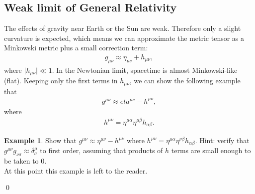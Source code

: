 \documentclass{book}
\theoremstyle{definition}
\newtheorem{exmp}{Example}[section]
\begin{document}
\subsection{Weak limit of General Relativity}
The effects of gravity near Earth or the Sun are weak. Therefore only a slight curvature is expected, which means we can approximate the metric tensor as a Minkowski metric plus a small correction term:
\begin{align*}
g_{\mu\nu} \approx \eta_{\mu\nu} + h_{\mu\nu},
\end{align*}
where $\vert h_{\mu\nu} \vert \ll 1$. In the Newtonian limit, spacetime is almost Minkowski-like (flat). Keeping only the first terms in $h_{\mu\nu}$, we can show the following example that 
\begin{align*}
g^{\mu\nu} \approx eta^{\mu\nu} - h^{\mu\nu},
\end{align*}
where 
\begin{align*}
h^{\mu\nu} = \eta^{\mu\alpha}\eta^{\mu\beta}h_{\alpha\beta}.
\end{align*}

\begin{exmp}
	Show that $g^{\mu\nu} \approx \eta^{\mu\nu} - h^{\mu\nu}$ where $h^{\mu\nu} = \eta^{\mu\alpha}\eta^{\nu\beta}h_{\alpha\beta}$. Hint: verify that $g^{\mu\nu}g_{\nu\sigma} \approx \delta^{\mu}_{\sigma} $ to first order, assuming that products of $h$ terms are small enough to be taken to 0.\\
	
	At this point this example is left to the reader.\\ 
\end{exmp}\qed
\end{document}
